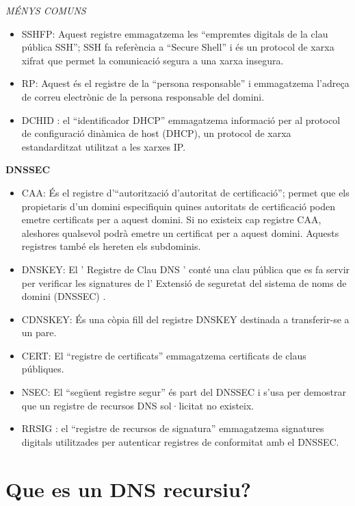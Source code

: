 \documentclass[]{article}
\begin{document}
\emph{MÉNYS COMUNS}

\begin{itemize}
\item
  SSHFP: Aquest registre emmagatzema les ``empremtes digitals de la clau
  pública SSH''; SSH fa referència a ``Secure Shell'' i és un protocol
  de xarxa xifrat que permet la comunicació segura a una xarxa insegura.
\item
  RP: Aquest és el registre de la ``persona responsable'' i emmagatzema
  l'adreça de correu electrònic de la persona responsable del domini.
\item
  DCHID : el ``identificador DHCP'' emmagatzema informació per al
  protocol de configuració dinàmica de host (DHCP), un protocol de xarxa
  estandarditzat utilitzat a les xarxes IP.
\end{itemize}

\textbf{DNSSEC}

\begin{itemize}
\item
  CAA: És el registre d'``autorització d'autoritat de certificació'';
  permet que els propietaris d'un domini especifiquin quines autoritats
  de certificació poden emetre certificats per a aquest domini. Si no
  existeix cap registre CAA, aleshores qualsevol podrà emetre un
  certificat per a aquest domini. Aquests registres també els hereten
  els subdominis.
\item
  DNSKEY: El ' Registre de Clau DNS ' conté una clau pública que es fa
  servir per verificar les signatures de l' Extensió de seguretat del
  sistema de noms de domini (DNSSEC) .
\item
  CDNSKEY: És una còpia fill del registre DNSKEY destinada a
  transferir-se a un pare.
\item
  CERT: El ``registre de certificats'' emmagatzema certificats de claus
  públiques.
\item
  NSEC: El ``següent registre segur'' és part del DNSSEC i s'usa per
  demostrar que un registre de recursos DNS sol·licitat no existeix.
\item
  RRSIG : el ``registre de recursos de signatura'' emmagatzema
  signatures digitals utilitzades per autenticar registres de
  conformitat amb el DNSSEC.
\end{itemize}

\hypertarget{que-es-un-dns-recursiu}{%
\section{\texorpdfstring{\textbf{Que es un DNS
recursiu?}}{Que es un DNS recursiu?}}\label{que-es-un-dns-recursiu}}
\end{document}
